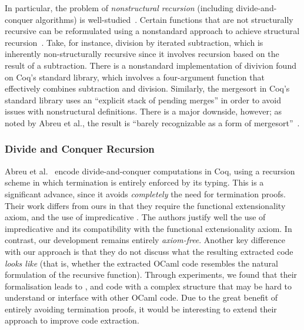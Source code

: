 \documentclass[ a4paper, UKenglish, cleveref, autoref, thm-restate]{lipics-v2021}
\begin{document}
In particular, the problem of \emph{nonstructural recursion} (including
divide-and-conquer algorithms) is well-studied~\cite{BOVE_KRAUSS_SOZEAU_2016}.
Certain functions that are not structurally recursive can be reformulated using
a nonstandard approach to achieve structural recursion~\cite{AbreuDHJMS23}.
Take, for instance, division by iterated subtraction, which is inherently
non-structurally recursive since it involves recursion based on the result of a
subtraction. There is a nonstandard implementation of divivion found on Coq's
standard library, which involves a four-argument function that effectively
combines subtraction and division. Similarly, the mergesort in Coq's standard
library uses an ``explicit stack of pending merges'' in order to avoid issues
with nonstructural definitions. There is a major downside, however; as noted by
Abreu et al., the result is ``barely recognizable as a form of
mergesort''~\cite{AbreuDHJMS23}.
 
\subsubsection{Divide and Conquer Recursion}\label{sec:reccoq}

Abreu et al.~\cite{AbreuDHJMS23} encode divide-and-conquer computations in Coq,
using a recursion scheme in which termination is entirely enforced by its
typing.  This is a significant advance, since it avoids \emph{completely} the
need for termination proofs. Their work differs from ours in that they require
the functional extensionality axiom, and the use of impredicative .
The authors justify well the use of impredicative  and its
compatibility with the functional extensionality axiom. In contrast, our
development remains entirely \emph{axiom-free}. Another key difference with our
approach is that they do not discuss what the resulting extracted code
\emph{looks like} (that is, whether the extracted OCaml code resembles the
natural formulation of the recursive function). Through experiments, we found
that their formalisation leads to , and code with a complex
structure that may be hard to understand or interface with other OCaml code.
Due to the great benefit of entirely avoiding termination proofs, it would be
interesting to extend their approach to improve code extraction.
\end{document}
